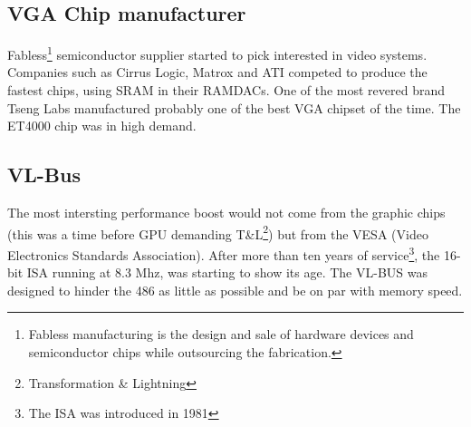 \subsection{VGA Chip manufacturer}
Fabless\footnote{Fabless manufacturing is the design and sale of hardware devices and semiconductor chips while outsourcing the fabrication.} semiconductor supplier started to pick interested in video systems. Companies such as Cirrus Logic, Matrox and ATI competed to produce the fastest chips, using SRAM in their RAMDACs. One of the most revered brand Tseng Labs manufactured probably one of the best VGA chipset of the time. The ET4000 chip was in high demand.\\
\par
{}
\par


\subsection{VL-Bus}
The most intersting performance boost would not come from the graphic chips (this was a time before GPU demanding T\&L\footnote{Transformation \& Lightning}) but from the VESA (Video Electronics Standards Association). After more than ten years of service\footnote{The ISA was introduced in 1981}, the 16-bit ISA running at 8.3 Mhz, was starting to show its age. The VL-BUS was designed to hinder the 486 as little as possible and be on par with memory speed.
\par
{}

